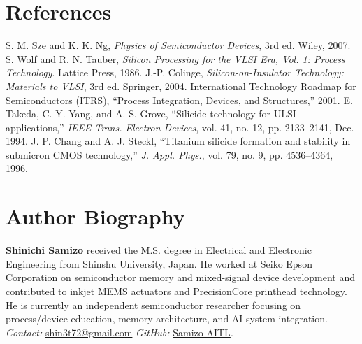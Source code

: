 \documentclass[conference]{IEEEtran}
\begin{document}
\section*{References}
\begin{thebibliography}{99}
 S. M. Sze and K. K. Ng, \textit{Physics of Semiconductor Devices}, 3rd ed. Wiley, 2007.
 S. Wolf and R. N. Tauber, \textit{Silicon Processing for the VLSI Era, Vol. 1: Process Technology}. Lattice Press, 1986.
 J.-P. Colinge, \textit{Silicon-on-Insulator Technology: Materials to VLSI}, 3rd ed. Springer, 2004.
 International Technology Roadmap for Semiconductors (ITRS), ``Process Integration, Devices, and Structures,'' 2001.
 E. Takeda, C. Y. Yang, and A. S. Grove, ``Silicide technology for ULSI applications,'' \textit{IEEE Trans. Electron Devices}, vol. 41, no. 12, pp. 2133--2141, Dec. 1994.
 J. P. Chang and A. J. Steckl, ``Titanium silicide formation and stability in submicron CMOS technology,'' \textit{J. Appl. Phys.}, vol. 79, no. 9, pp. 4536--4364, 1996.
\end{thebibliography}

\section*{Author Biography}
\textbf{Shinichi Samizo} received the M.S. degree in Electrical and Electronic Engineering from Shinshu University, Japan.  
He worked at Seiko Epson Corporation on semiconductor memory and mixed-signal device development and contributed to inkjet MEMS actuators and PrecisionCore printhead technology.  
He is currently an independent semiconductor researcher focusing on process/device education, memory architecture, and AI system integration.\\
\emph{Contact:} \href{mailto:shin3t72@gmail.com}{shin3t72@gmail.com}\quad
\emph{GitHub:} \href{https://github.com/Samizo-AITL}{Samizo-AITL}.
\end{document}
